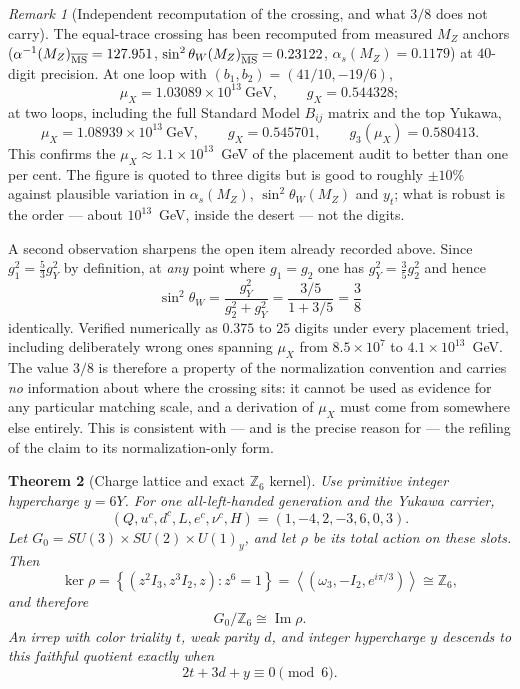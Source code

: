 \documentclass[11pt]{article}
\theoremstyle{plain}
\newtheorem{theorem}{Theorem}[section]
\theoremstyle{definition}
\theoremstyle{remark}
\newtheorem{remark}[theorem]{Remark}
\begin{document}
\begin{remark}[Independent recomputation of the crossing, and what \(3/8\) does not carry]
The equal-trace crossing has been recomputed from measured \(M_Z\) anchors (\(\alpha^{-1}(M_Z)_{\overline{\rm MS}}=127.951\), \(\sin^2\theta_W(M_Z)_{\overline{\rm MS}}=0.23122\), \(\alpha_s(M_Z)=0.1179\)) at \(40\)-digit precision. At one loop with \((b_1,b_2)=(41/10,-19/6)\),
\[
\mu_X=1.03089\times10^{13}~\text{GeV},
\qquad
g_X=0.544328 ;
\]
at two loops, including the full Standard Model \(B_{ij}\) matrix and the top Yukawa,
\[
\mu_X=1.08939\times10^{13}~\text{GeV},
\qquad
g_X=0.545701,
\qquad
g_3(\mu_X)=0.580413 .
\]
This confirms the \(\mu_X\approx1.1\times10^{13}\)~GeV of the placement audit to better than one per cent. The figure is quoted to three digits but is good to roughly \(\pm10\%\) against plausible variation in \(\alpha_s(M_Z)\), \(\sin^2\theta_W(M_Z)\) and \(y_t\); what is robust is the order --- about \(10^{13}\)~GeV, inside the desert --- not the digits.

A second observation sharpens the open item already recorded above. Since \(g_1^2=\tfrac53 g_Y^2\) by definition, at \emph{any} point where \(g_1=g_2\) one has \(g_Y^2=\tfrac35 g_2^2\) and hence
\[
\sin^2\theta_W=\frac{g_Y^2}{g_2^2+g_Y^2}=\frac{3/5}{1+3/5}=\frac38
\]
identically. Verified numerically as \(0.375\) to \(25\) digits under every placement tried, including deliberately wrong ones spanning \(\mu_X\) from \(8.5\times10^{7}\) to \(4.1\times10^{13}\)~GeV. The value \(3/8\) is therefore a property of the normalization convention and carries \emph{no} information about where the crossing sits: it cannot be used as evidence for any particular matching scale, and a derivation of \(\mu_X\) must come from somewhere else entirely. This is consistent with --- and is the precise reason for --- the refiling of the claim to its normalization-only form.
\end{remark}

\begin{theorem}[Charge lattice and exact \(\mathbb Z_6\) kernel]
Use primitive integer hypercharge \(y=6Y\). For one all-left-handed generation and the Yukawa carrier,
\[
(Q,u^c,d^c,L,e^c,\nu^c,H)
=
(1,-4,2,-3,6,0,3).
\]
Let \(G_0=SU(3)\times SU(2)\times U(1)_y\), and let \(\rho\) be its total action on these slots. Then
\[
\ker\rho
=
\left\{(z^2I_3,z^3I_2,z):z^6=1\right\}
=
\left\langle(\omega_3,-I_2,e^{i\pi/3})\right\rangle
\cong\mathbb Z_6,
\]
and therefore
\[
G_0/\mathbb Z_6\cong\operatorname{Im}\rho.
\]
An irrep with color triality \(t\), weak parity \(d\), and integer hypercharge \(y\) descends to this faithful quotient exactly when
\[
2t+3d+y\equiv0\pmod 6.
\]
\end{theorem}
\end{document}
